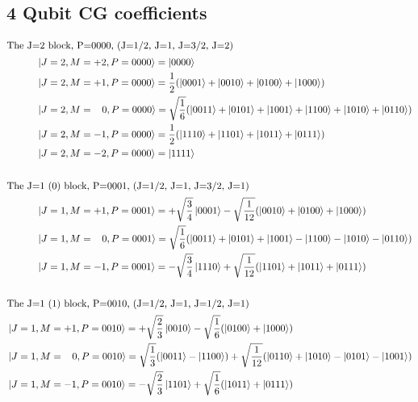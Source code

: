 \subsection{4 Qubit CG coefficients}
\begin{subequations}
\begin{align}
\intertext{The J=2 block, P=0000, (J=1/2, J=1, J=3/2, J=2)}
\begin{split}
&\ket{J=2, M=+2, P=0000} = \ket{0000} \\
&\ket{J=2, M=+1, P=0000} = \frac{1}{2}(\ket{0001}+\ket{0010}+\ket{0100}+\ket{1000}) \\
&\ket{J=2, M=\;\;\;0, P=0000} = \sqrt{\frac{1}{6}}(\ket{0011}+\ket{0101}+\ket{1001}+\ket{1100}+\ket{1010}+\ket{0110}) \\
&\ket{J=2, M=-1, P=0000} = \frac{1}{2}(\ket{1110}+\ket{1101}+\ket{1011}+\ket{0111}) \\
&\ket{J=2, M=-2, P=0000} = \ket{1111} \\ 
\end{split} \\
\vspace{5pt} \nonumber \\
\intertext{The J=1 (0) block, P=0001, (J=1/2, J=1, J=3/2, J=1)}
\begin{split}
&\ket{J=1, M=+1, P=0001} =+\sqrt{\frac{3}{4}}\ket{0001} - \sqrt{\frac{1}{12}}(\ket{0010}+\ket{0100}+\ket{1000}) \\
&\ket{J=1, M=\;\;\;0, P=0001} = \sqrt{\frac{1}{6}}(\ket{0011}+\ket{0101}+\ket{1001}-\ket{1100}-\ket{1010}-\ket{0110}) \\
&\ket{J=1, M=-1, P=0001} =-\sqrt{\frac{3}{4}}\ket{1110} + \sqrt{\frac{1}{12}}(\ket{1101}+\ket{1011}+\ket{0111}) \\ 
\end{split} \\
\vspace{3pt} \nonumber \\
\intertext{The J=1 (1) block, P=0010, (J=1/2, J=1, J=1/2, J=1)}
\begin{split}
&\ket{J=1, M=+1, P=0010} =+\sqrt{\frac{2}{3}}\ket{0010} - \sqrt{\frac{1}{6}}(\ket{0100}+\ket{1000}) \\
&\ket{J=1, M=\;\;\;0, P=0010} = \sqrt{\frac{1}{3}}(\ket{0011}-\ket{1100}) + \sqrt{\frac{1}{12}}(\ket{0110}+\ket{1010}-\ket{0101}-\ket{1001})\\
&\ket{J=1, M=-1, P=0010} =-\sqrt{\frac{2}{3}}\ket{1101}+\sqrt{\frac{1}{6}}(\ket{1011}+\ket{0111})\\ 

\end{split}
\end{align}
\end{subequations}
